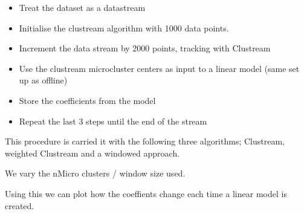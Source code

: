 \documentclass[]{article}
\newenvironment{Shaded}{\begin{snugshade}}{\end{snugshade}}
\newcommand{\KeywordTok}[1]{\textcolor[rgb]{0.13,0.29,0.53}{\textbf{{#1}}}}
\newcommand{\DataTypeTok}[1]{\textcolor[rgb]{0.13,0.29,0.53}{{#1}}}
\newcommand{\DecValTok}[1]{\textcolor[rgb]{0.00,0.00,0.81}{{#1}}}
\newcommand{\FloatTok}[1]{\textcolor[rgb]{0.00,0.00,0.81}{{#1}}}
\newcommand{\StringTok}[1]{\textcolor[rgb]{0.31,0.60,0.02}{{#1}}}
\newcommand{\CommentTok}[1]{\textcolor[rgb]{0.56,0.35,0.01}{\textit{{#1}}}}
\newcommand{\NormalTok}[1]{{#1}}
\begin{document}
\begin{itemize}
\item
  Treat the dataset as a datastream
\item
  Initialise the clustream algorithm with 1000 data points.
\item
  Increment the data stream by 2000 points, tracking with Clustream
\item
  Use the clustream microcluster centers as input to a linear model
  (same set up as offline)
\item
  Store the coefficients from the model
\item
  Repeat the last 3 steps until the end of the stream
\end{itemize}

This procedure is carried it with the following three algorithms;
Clustream, weighted Clustream and a windowed approach.

We vary the nMicro clusters / window size used.

Using this we can plot how the coeffients change each time a linear
model is created.

\begin{Shaded}
\end{Shaded}
\end{document}
